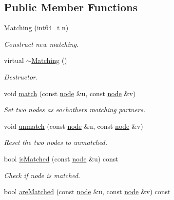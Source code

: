 \subsection*{Public Member Functions}
\begin{DoxyCompactItemize}
\item 
\hyperlink{class_networ_kit_1_1_matching_a9d358cca48ef83b667e7eb9095dc7699}{Matching} (int64\-\_\-t \hyperlink{class_networ_kit_1_1_index_map_abffdb945755f2789f33b5eb6e95430d8}{n})
\begin{DoxyCompactList}\small\item\em Construct new matching. \end{DoxyCompactList}\item 
virtual \hyperlink{class_networ_kit_1_1_matching_a09f6410ab15dbe1875691c2c96906052}{$\sim$\-Matching} ()
\begin{DoxyCompactList}\small\item\em Destructor. \end{DoxyCompactList}\item 
void \hyperlink{class_networ_kit_1_1_matching_a09ae97510791ef8a5165c76944f8f02e}{match} (const \hyperlink{namespace_networ_kit_a53fe3e4fd04ea024160e4d024dfebadf}{node} \&u, const \hyperlink{namespace_networ_kit_a53fe3e4fd04ea024160e4d024dfebadf}{node} \&v)
\begin{DoxyCompactList}\small\item\em Set two nodes as eachothers matching partners. \end{DoxyCompactList}\item 
void \hyperlink{class_networ_kit_1_1_matching_a66a2ced23196544647da2a605956e491}{unmatch} (const \hyperlink{namespace_networ_kit_a53fe3e4fd04ea024160e4d024dfebadf}{node} \&u, const \hyperlink{namespace_networ_kit_a53fe3e4fd04ea024160e4d024dfebadf}{node} \&v)
\begin{DoxyCompactList}\small\item\em Reset the two nodes to unmatched. \end{DoxyCompactList}\item 
bool \hyperlink{class_networ_kit_1_1_matching_abf1ff6be646ccfb468f568ea4951cee5}{is\-Matched} (const \hyperlink{namespace_networ_kit_a53fe3e4fd04ea024160e4d024dfebadf}{node} \&u) const 
\begin{DoxyCompactList}\small\item\em Check if node is matched. \end{DoxyCompactList}\item 
bool \hyperlink{class_networ_kit_1_1_matching_ad2920bb96b22c8f860ba7d465217eb59}{are\-Matched} (const \hyperlink{namespace_networ_kit_a53fe3e4fd04ea024160e4d024dfebadf}{node} \&u, const \hyperlink{namespace_networ_kit_a53fe3e4fd04ea024160e4d024dfebadf}{node} \&v) const 

\end{DoxyCompactItemize}
